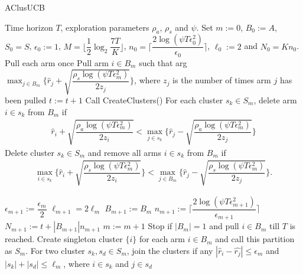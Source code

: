 \begin{algorithm}[th!]
\caption{AClusUCB}
\label{alg:aclusucb}
\begin{algorithmic}
 Time horizon $T$, exploration parameters $\rho_a$, $\rho_s$ and $\psi$.
 Set $m:=0$, $B_{0}:=A$, $S_0 = S$, $\epsilon_{0}:=1$, $M=\big \lfloor \dfrac{1}{2}\log_{2} \dfrac{7T}{K}\big\rfloor$, $n_{0}=\bigg\lceil\dfrac{2\log{(\psi T\epsilon_{0}^{2})}}{\epsilon_{0}}\bigg\rceil$, $\ell_{0}:=2$ and  $N_{0}=Kn_{0}$.
\State Pull each arm once
\State Pull arm $i\in B_m$ such that arg$\max_{j\in B_{m}}\bigg\lbrace \hat{r}_{j} + \sqrt{\dfrac{\rho_{s}\log{(\psi T\epsilon_{m}^{2})}}{2 z_{j}}} \bigg\rbrace$, where $z_j$ is the number of times arm $j$ has been pulled
\State $t:=t+1$
\State Call CreateClusters()
\ArmElim
\State For each cluster $s_k \in S_{m}$, delete arm ${i}\in s_{k}$ from $B_{m}$ if
\begin{align*}
\hat{r}_{i} + \sqrt{\dfrac{\rho_{a}\log{(\psi T\epsilon_{m}^{2})}}{2 z_{i}}}  < \max_{{j}\in s_{k}}\bigg\lbrace\hat{r}_{j} -\sqrt{\dfrac{\rho_{a}\log{(\psi T\epsilon_{m}^{2})}}{2 z_{j}}} \bigg\rbrace
\end{align*}
\EndArmElim
\ClusElim
\State Delete cluster $s_{k}\in S_{m}$ and remove all arms $i\in s_{k}$ from $B_{m}$ if 
\begin{align*}
 \max_{{i}\in s_{k}}\bigg\lbrace\hat{r}_{i} + \sqrt{\dfrac{\rho_{s}\log{(\psi T\epsilon_{m}^{2})}}{2 z_{i}}}\bigg\rbrace 
 < \max_{{j}\in B_{m}} \bigg\lbrace\hat{r}_{j} - \sqrt{\dfrac{\rho_{s} \log{(\psi T\epsilon_{m}^{2})}}{2 z_{j}}}\bigg\rbrace.
\end{align*}
\EndClusElim

\State $\epsilon_{m+1}:=\dfrac{\epsilon_{m}}{2}$\vspace{0.5ex}
\State $\ell_{m+1}=2\ell_{m}$
\State $B_{m+1}:=B_{m}$
\State $n_{m+1}:=\bigg\lceil\dfrac{2\log{(\psi T\epsilon_{m+1}^{2})}}{\epsilon_{m+1}}\bigg\rceil$
\State $N_{m+1}:=t+|B_{m+1}| n_{m+1}$
\State $m:=m+1$
\State Stop if $|B_{m}|=1$ and pull ${i}\in B_{m}$ till $T$ is reached.
\EndIf
\EndFor
{}
\State Create singleton cluster $\lbrace i\rbrace$ for each arm $i\in B_{m}$ and call this partition as $S_{m}$.
\State For two cluster $s_{k},s_{d}\in S_{m}$, join the clusters if any $|\hat{r}_{i}-\hat{r_{j}}| \leq \epsilon_{m}$ and $|s_{k}|+|s_{d}|\leq \ell_{m}$, where $i\in s_{k}$ and $j\in s_{d}$ 
\EndProcedure
\end{algorithmic}
\end{algorithm}

